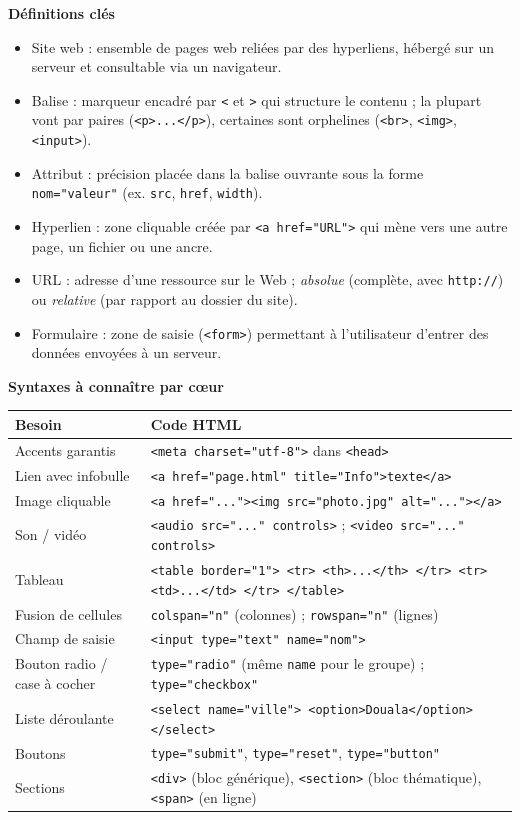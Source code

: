 \documentclass[11pt]{article}
\newcommand{\cle}[1]{{\popxbold\color{popdark}#1}}
\begin{document}
\begin{bilan}
\textbf{Définitions clés}
\begin{itemize}
  \item \cle{Site web} : ensemble de pages web reliées par des hyperliens, hébergé sur un serveur et consultable via un navigateur.
  \item \cle{Balise} : marqueur encadré par \texttt{<} et \texttt{>} qui structure le contenu ; la plupart vont par paires (\texttt{<p>...</p>}), certaines sont orphelines (\texttt{<br>}, \texttt{<img>}, \texttt{<input>}).
  \item \cle{Attribut} : précision placée dans la balise ouvrante sous la forme \texttt{nom="valeur"} (ex. \texttt{src}, \texttt{href}, \texttt{width}).
  \item \cle{Hyperlien} : zone cliquable créée par \texttt{<a href="URL">} qui mène vers une autre page, un fichier ou une ancre.
  \item \cle{URL} : adresse d'une ressource sur le Web ; \emph{absolue} (complète, avec \texttt{http://}) ou \emph{relative} (par rapport au dossier du site).
  \item \cle{Formulaire} : zone de saisie (\texttt{<form>}) permettant à l'utilisateur d'entrer des données envoyées à un serveur.
\end{itemize}

\textbf{Syntaxes à connaître par c\oe ur}
\begin{center}
\begin{tabularx}{\linewidth}{|l|X|}
\hline
\rowcolor{popblueL} \textbf{Besoin} & \textbf{Code HTML} \\
\hline
Accents garantis & \texttt{<meta charset="utf-8">} dans \texttt{<head>} \\
\hline
Lien avec infobulle & \texttt{<a href="page.html" title="Info">texte</a>} \\
\hline
Image cliquable & \texttt{<a href="..."><img src="photo.jpg" alt="..."></a>} \\
\hline
Son / vidéo & \texttt{<audio src="..." controls>} ; \texttt{<video src="..." controls>} \\
\hline
Tableau & \texttt{<table border="1"> <tr> <th>...</th> </tr> <tr> <td>...</td> </tr> </table>} \\
\hline
Fusion de cellules & \texttt{colspan="n"} (colonnes) ; \texttt{rowspan="n"} (lignes) \\
\hline
Champ de saisie & \texttt{<input type="text" name="nom">} \\
\hline
Bouton radio / case à cocher & \texttt{type="radio"} (même \texttt{name} pour le groupe) ; \texttt{type="checkbox"} \\
\hline
Liste déroulante & \texttt{<select name="ville"> <option>Douala</option> </select>} \\
\hline
Boutons & \texttt{type="submit"}, \texttt{type="reset"}, \texttt{type="button"} \\
\hline
Sections & \texttt{<div>} (bloc générique), \texttt{<section>} (bloc thématique), \texttt{<span>} (en ligne) \\
\hline
\end{tabularx}
\end{center}


\end{bilan}
\end{document}
